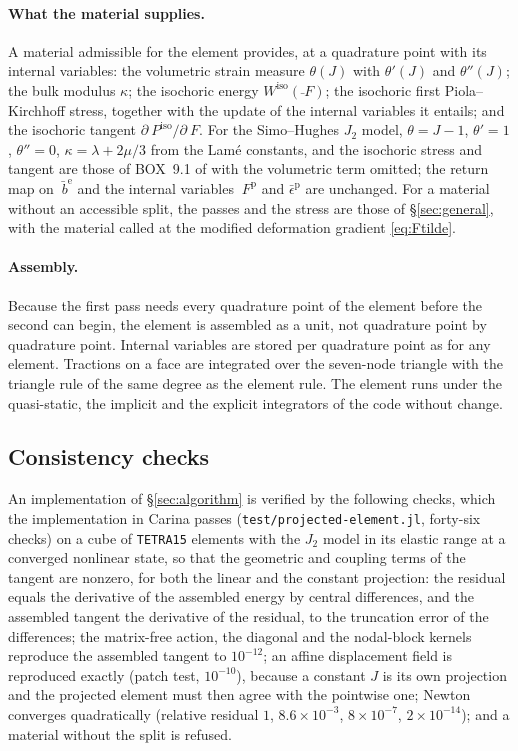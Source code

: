 \documentclass[11pt]{article}
\newcommand{\F}{~F}
\renewcommand{\P}{~P}
\newcommand{\supiso}{^{\mathrm{iso}}}
\newcommand{\code}[1]{\texttt{#1}}
\theoremstyle{definition}
\theoremstyle{plain}
\begin{document}
\paragraph{What the material supplies.} A material admissible for the
element provides, at a quadrature point with its internal variables: the
volumetric strain measure $\theta(J)$ with $\theta'(J)$ and $\theta''(J)$;
the bulk modulus $\kappa$; the isochoric energy $W\supiso(\bar\F)$; the
isochoric first Piola--Kirchhoff stress, together with the update of the
internal variables it entails; and the isochoric tangent
$\partial\P\supiso/\partial\F$. For the Simo--Hughes $J_2$ model,
$\theta = J - 1$, $\theta' = 1$, $\theta'' = 0$, $\kappa = \lambda +
2\mu/3$ from the Lam\'e constants, and the isochoric stress and tangent are
those of BOX~9.1 of \citet{SimoHughes:1998} with the volumetric term
omitted; the return map on $\bar{~b}^{\mathrm e}$ and the internal
variables $\F^{\mathrm p}$ and $\bar\epsilon^{\mathrm p}$ are unchanged.
For a material without an accessible split, the passes and the stress are
those of \S\ref{sec:general}, with the material called at the modified
deformation gradient \eqref{eq:Ftilde}.

\paragraph{Assembly.} Because the first pass needs every quadrature point
of the element before the second can begin, the element is assembled as a
unit, not quadrature point by quadrature point. Internal variables are
stored per quadrature point as for any element. Tractions on a face are
integrated over the seven-node triangle with the triangle rule of the same
degree as the element rule. The element runs under the quasi-static, the
implicit and the explicit integrators of the code without change.

\subsection{Consistency checks}
\label{sec:checks}

An implementation of \S\ref{sec:algorithm} is verified by the following
checks, which the implementation in Carina passes
(\code{test/projected-element.jl}, forty-six checks) on a cube of
\code{TETRA15} elements with the $J_2$ model in its elastic range at a
converged nonlinear state, so that the geometric and coupling terms of the
tangent are nonzero, for both the linear and the constant projection:
the residual equals the derivative of the assembled energy by central
differences, and the assembled tangent the derivative of the residual, to
the truncation error of the differences; the matrix-free action, the
diagonal and the nodal-block kernels reproduce the assembled tangent to
$10^{-12}$; an affine displacement field is reproduced exactly (patch test,
$10^{-10}$), because a constant $J$ is its own projection and the projected
element must then agree with the pointwise one; Newton converges
quadratically (relative residual $1$, $8.6\times10^{-3}$, $8\times10^{-7}$,
$2\times10^{-14}$); and a material without the split is refused.
\end{document}
